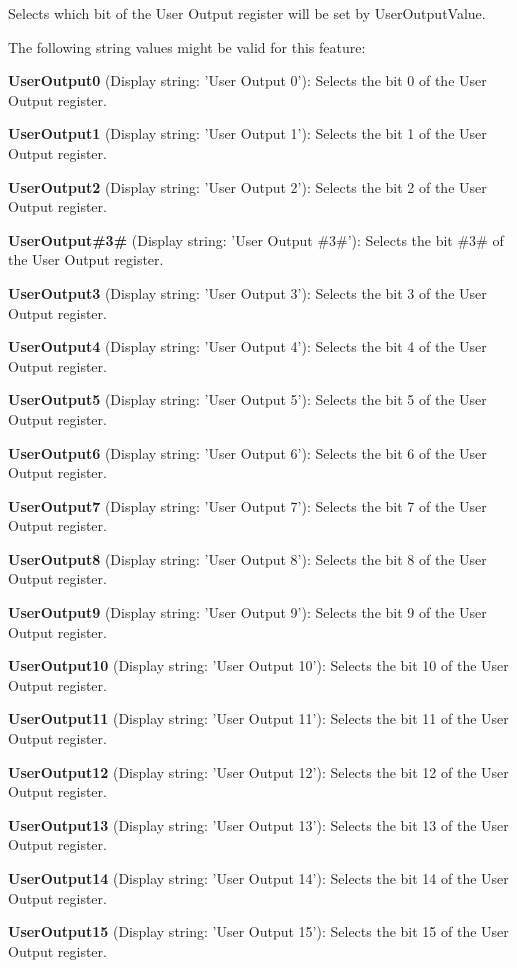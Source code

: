 Selects which bit of the User Output register will be set by User\+Output\+Value.

The following string values might be valid for this feature\+:
\begin{DoxyItemize}
\item {\bfseries User\+Output0} (Display string\+: 'User Output 0')\+: Selects the bit 0 of the User Output register.
\item {\bfseries User\+Output1} (Display string\+: 'User Output 1')\+: Selects the bit 1 of the User Output register.
\item {\bfseries User\+Output2} (Display string\+: 'User Output 2')\+: Selects the bit 2 of the User Output register.
\item {\bfseries User\+Output\#3\#} (Display string\+: 'User Output \#3\#')\+: Selects the bit \#3\# of the User Output register.
\item {\bfseries User\+Output3} (Display string\+: 'User Output 3')\+: Selects the bit 3 of the User Output register.
\item {\bfseries User\+Output4} (Display string\+: 'User Output 4')\+: Selects the bit 4 of the User Output register.
\item {\bfseries User\+Output5} (Display string\+: 'User Output 5')\+: Selects the bit 5 of the User Output register.
\item {\bfseries User\+Output6} (Display string\+: 'User Output 6')\+: Selects the bit 6 of the User Output register.
\item {\bfseries User\+Output7} (Display string\+: 'User Output 7')\+: Selects the bit 7 of the User Output register.
\item {\bfseries User\+Output8} (Display string\+: 'User Output 8')\+: Selects the bit 8 of the User Output register.
\item {\bfseries User\+Output9} (Display string\+: 'User Output 9')\+: Selects the bit 9 of the User Output register.
\item {\bfseries User\+Output10} (Display string\+: 'User Output 10')\+: Selects the bit 10 of the User Output register.
\item {\bfseries User\+Output11} (Display string\+: 'User Output 11')\+: Selects the bit 11 of the User Output register.
\item {\bfseries User\+Output12} (Display string\+: 'User Output 12')\+: Selects the bit 12 of the User Output register.
\item {\bfseries User\+Output13} (Display string\+: 'User Output 13')\+: Selects the bit 13 of the User Output register.
\item {\bfseries User\+Output14} (Display string\+: 'User Output 14')\+: Selects the bit 14 of the User Output register.
\item {\bfseries User\+Output15} (Display string\+: 'User Output 15')\+: Selects the bit 15 of the User Output register.
\end{DoxyItemize}

